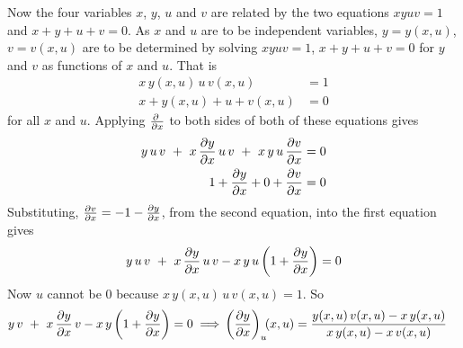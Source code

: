 \begin{solution}
Now the four variables $x$, $y$, $u$ and $v$ are related by the two equations
$xyuv=1$ and $x+y+u+v=0$. As $x$ and $u$ are to be independent variables,
$y=y(x,u)$, $v=v(x,u)$ are to be determined by solving $xyuv=1$, $x+y+u+v=0$
for $y$ and $v$ as functions of $x$ and $u$. That is 
\begin{align*}
x\,y(x,u)\,u\,v(x,u)&=1 \\
x+y(x,u)+u+v(x,u)&=0
\end{align*}
for all $x$ and $u$.
Applying 
$\pdiff{}{x}$ to both sides of both of these equations
gives
\begin{align*}
y\,u\,v\ +\ x\,\pdiff{y}{x}\,u\,v\ +\ x\,y\,u\,\pdiff{v}{x}&=0
\\
1+\pdiff{y}{x}+0+\pdiff{v}{x}&=0
\end{align*}
Substituting, $\pdiff{v}{x}=-1-\pdiff{y}{x}$,
from the second equation, into the first equation gives
\begin{align*}
y\,u\,v\ +\ x\,\pdiff{y}{x}\,u\,v-x\,y\,u
           \left(1+\pdiff{y}{x}\right)=0
\end{align*}
Now $u$ cannot be $0$ because $x\,y(x,u)\,u\,v(x,u)=1$. So
\begin{align*}
y\,v\ +\ x\,\pdiff{y}{x}\,v-x\,y\left(1+\pdiff{y}{x}\right)=0
\implies & \left(\pdiff{y}{x}\right)_u\!\!(x,u)
=\frac{y(x,u)\,v(x,u)-x\,y(x,u)}{x\,y(x,u)-x\,v(x,u)}
\end{align*}

\end{solution}
